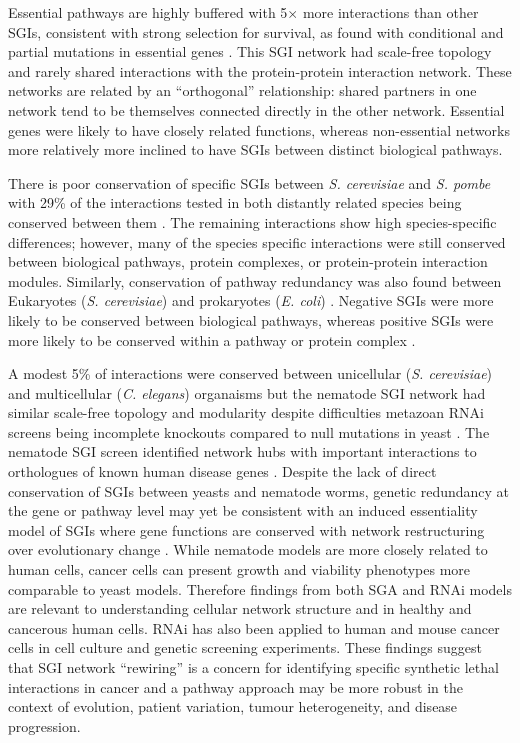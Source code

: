 Essential pathways are highly buffered with 5$\times$ more interactions than other SGIs, consistent with strong selection for survival, as found with conditional and partial mutations in essential genes \citep{Davierwala2005}. This SGI network had scale-free topology and rarely shared interactions with the protein-protein interaction network. These networks are related by an ``orthogonal'' relationship: shared partners in one network tend to be themselves connected directly in the other network. Essential genes were likely to have closely related functions, whereas non-essential networks more relatively more inclined to have SGIs between distinct biological pathways. 

There is poor conservation of specific SGIs between \textit{S. cerevisiae} and \textit{S. pombe} with 29\% of the interactions tested in both distantly related species being conserved between them \citep{Dixon2008}. The remaining interactions show high species-specific differences; however, many of the species specific interactions were still conserved between biological pathways, protein complexes, or protein-protein interaction modules. Similarly, conservation of pathway redundancy was also found between  Eukaryotes (\textit{S. cerevisiae}) and prokaryotes (\textit{E. coli}) \citep{Butland2008}. Negative SGIs were more likely to be conserved between biological pathways, whereas positive SGIs were more likely to be conserved within a pathway or protein complex \citep{Roguev2008}. 

A modest 5\% of interactions were conserved between unicellular (\textit{S. cerevisiae}) and multicellular (\textit{C. elegans}) organaisms but the nematode SGI network had similar scale-free topology and modularity despite difficulties metazoan RNAi screens being incomplete knockouts compared to null mutations in yeast \citep{Bussey2006}. The nematode SGI screen identified network hubs with important interactions to orthologues of known human disease genes \citep{Lehner2006}. Despite the lack of direct conservation of SGIs between yeasts and nematode worms, genetic redundancy at the gene or pathway level may yet be consistent with an induced essentiality model of SGIs where gene functions are conserved with network restructuring over evolutionary change \citep{Tischler2008}. While nematode models are more closely related to human cells, cancer cells can present growth and viability phenotypes more comparable to yeast models. Therefore findings from both SGA and RNAi models are relevant to understanding cellular network structure and in healthy and cancerous human cells. RNAi has also been applied to human and mouse cancer cells in cell culture and genetic screening experiments. These findings suggest that SGI network ``rewiring'' is a concern for identifying specific synthetic lethal interactions in cancer and a pathway approach may be more robust in the context of evolution, patient variation, tumour heterogeneity, and disease progression.  

